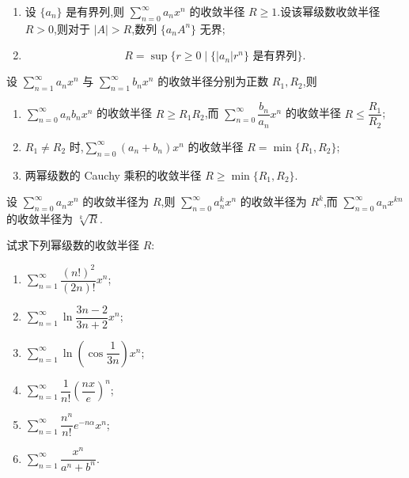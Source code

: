 \begin{proposition}[\markstar]
    \begin{enumerate}
        \item 设 $\{a_n\}$ 是有界列,则 $\displaystyle\sum\limits_{n=0}^{\infty}a_nx^n$ 的收敛半径 $R\geq1$.设该幂级数收敛半径 $R>0$,则对于 $|A|>R$,数列 $\{a_nA^n\}$ 无界;
        \item
              \[
                  R=\sup\{r\geq0\mid \{|a_n|r^n\}\text{ 是有界列}\}.
              \]
    \end{enumerate}
\end{proposition}

\begin{proposition}[\markstar]
    设 $\displaystyle\sum\limits_{n=1}^{\infty}a_nx^n$ 与 $\displaystyle\sum\limits_{n=1}^{\infty}b_nx^n$ 的收敛半径分别为正数 $R_1,R_2$,则
    \begin{enumerate}
        \item $\displaystyle\sum\limits_{n=0}^{\infty}a_nb_nx^n$ 的收敛半径 $R\geq R_1R_2$,而 $\displaystyle\sum\limits_{n=0}^{\infty}\dfrac{b_n}{a_n}x^n$ 的收敛半径 $R\leq\dfrac{R_1}{R_2}$;
        \item $R_1\neq R_2$ 时,$\displaystyle\sum\limits_{n=0}^{\infty}(a_n+b_n)x^n$ 的收敛半径 $R=\min\{R_1,R_2\}$;
        \item 两幂级数的 Cauchy 乘积的收敛半径 $R\geq\min\{R_1,R_2\}$.
    \end{enumerate}
\end{proposition}

\begin{proposition}[\markstar]
    设 $\displaystyle\sum\limits_{n=0}^{\infty}a_nx^n$ 的收敛半径为 $R$,则 $\displaystyle\sum\limits_{n=0}^{\infty}a_n^kx^n$ 的收敛半径为 $R^k$,而 $\displaystyle\sum\limits_{n=0}^{\infty}a_nx^{kn}$ 的收敛半径为 $\sqrt[k]{R}$.
\end{proposition}

\begin{example}
    试求下列幂级数的收敛半径 $R$:
    \begin{enumerate}
        \item $\displaystyle\sum\limits_{n=1}^{\infty}\dfrac{(n!)^2}{(2n)!}x^n$;
        \item $\displaystyle\sum\limits_{n=1}^{\infty}\ln\dfrac{3n-2}{3n+2}x^n$;
        \item $\displaystyle\sum\limits_{n=1}^{\infty}\ln\left(\cos\dfrac{1}{3n}\right)x^n$;
        \item $\displaystyle\sum\limits_{n=1}^{\infty}\dfrac{1}{n!}\left(\dfrac{nx}{e}\right)^n$;
        \item $\displaystyle\sum\limits_{n=1}^{\infty}\dfrac{n^n}{n!}e^{-n\alpha}x^n$;
        \item $\displaystyle\sum\limits_{n=1}^{\infty}\dfrac{x^n}{a^n+b^n}$.
    \end{enumerate}
\end{example}
\exampleblank

